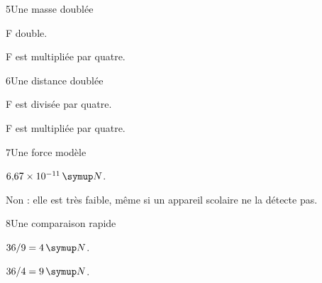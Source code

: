 \par\noindent\begin{minipage}{\linewidth}
\begin{corrige}{5}{Une masse doublée}
\begin{questions}
\item F double.
\item F est multipliée par quatre.
\end{questions}
\end{corrige}
\end{minipage}
\par\noindent\begin{minipage}{\linewidth}
\begin{corrige}{6}{Une distance doublée}
\begin{questions}
\item F est divisée par quatre.
\item F est multipliée par quatre.
\end{questions}
\end{corrige}
\end{minipage}
\par\noindent\begin{minipage}{\linewidth}
\begin{corrige}{7}{Une force modèle}
\begin{questions}
\item $6{,}67\times10^{-11}\unite N$.
\item Non : elle est très faible, même si un appareil scolaire ne la détecte pas.
\end{questions}
\end{corrige}
\end{minipage}
\par\noindent\begin{minipage}{\linewidth}
\begin{corrige}{8}{Une comparaison rapide}
\begin{questions}
\item $36/9=4\unite N$.
\item $36/4=9\unite N$.
\end{questions}
\end{corrige}
\end{minipage}
